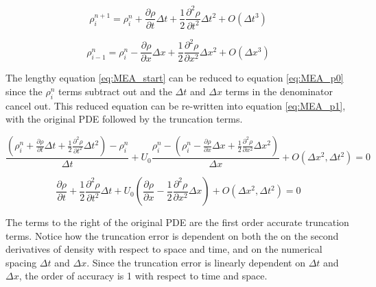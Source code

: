 \documentclass{mc2015}
\begin{document}
    \begin{equation}
    	\label{eq:rho_taylor_series_time}
    	\rho_{i}^{n+1} =  \rho_{i}^{n} + 
    	\frac{\partial \rho}{\partial t} \Delta t +
    	\frac{1}{2} \frac{\partial^2 \rho}{\partial t^2} \Delta t^2 + O(\Delta t^{3})
    \end{equation}
    
    \begin{equation}
    	\label{eq:rho_taylor_series_space}
    	\rho_{i-1}^{n} =  \rho_{i}^{n} - 
    	\frac{\partial \rho}{\partial x} \Delta x +
    	\frac{1}{2} \frac{\partial^2 \rho}{\partial x^2} \Delta x^2 + O(\Delta x^{3})
    \end{equation}
    
    The lengthy equation \ref{eq:MEA_start} can be reduced to equation
    \ref{eq:MEA_p0} since the $\rho_{i}^{n}$ terms subtract out and the $\Delta
    t$ and $\Delta x$ terms in the denominator cancel out. This reduced equation
    can be re-written into equation \ref{eq:MEA_p1}, with the original PDE
    followed by the truncation terms. 
    
    \begin{equation}
    	\label{eq:MEA_start}
    	\frac{ \left( \rho_{i}^{n} + \frac{\partial \rho}{\partial t} \Delta t +
    	\frac{1}{2} \frac{\partial^2 \rho}{\partial t^2} \Delta t^2 \right)-\rho_{i}^{n} }{\Delta t} 
    	+ U_{0} \frac{\rho_{i}^{n} - \left( \rho_{i}^{n} -  \frac{\partial \rho}{\partial x} \Delta x + 
    	\frac{1}{2} \frac{\partial^2 \rho}{\partial x^2} \Delta x^2 \right)}{\Delta x} 
    	+ O(\Delta x^{2},\Delta t^{2}) 
    	= 0
    \end{equation}
    
    \begin{equation}
    	\label{eq:MEA_p0}
    	 \frac{\partial \rho}{\partial t}  + \frac{1}{2} \frac{\partial^2 \rho}{\partial t^2} \Delta t +
    	 U_{0} \left(   \frac{\partial \rho}{\partial x}  - \frac{1}{2} \frac{\partial^2 \rho}{\partial x^2} \Delta x \right) 
    	 + O(\Delta x^{2},\Delta t^{2}) 
    	 = 0
    \end{equation}
    
    The terms to the right of the original PDE are the first order accurate
    truncation terms. Notice how the truncation error is  dependent on both the
    on the second derivatives of density with respect to space and time, and on
    the numerical spacing $\Delta t$ and $\Delta x$. Since the truncation
    error is linearly dependent on $\Delta t$ and $\Delta x$, the order of
    accuracy is 1 with respect to time and space. 
    
\end{document}
